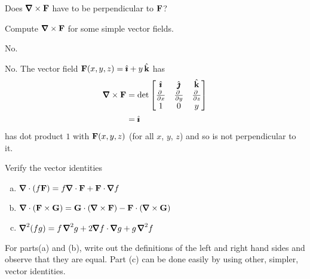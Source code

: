 \begin{question}
Does $\vnabla\times \vF$ have to be perpendicular to $\mathbf{F}$?
\end{question}

\begin{hint} 
Compute $\vnabla\times \vF$ for some simple vector fields.
\end{hint}

\begin{answer} 
No.
\end{answer}

\begin{solution} 
No.  The vector field $\mathbf{F}(x,y,z) = \hat{\pmb{\imath}} +y\,\hat{\mathbf{k}}$ has
\begin{align*}
\vnabla\times \vF
&=\det\left[\begin{matrix} \hi & \hj & \hk \\
                           \pdiff{}{x} & \pdiff{}{y} & \pdiff{}{z} \\
                           1 & 0 & y
            \end{matrix}\right] \\
&=\hi
\end{align*}
has dot product $1$ with $\mathbf{F}(x,y,z)$ (for all $x$, $y$, $z$) and
so is not perpendicular to it.
\end{solution}

\begin{question}
Verify the vector identities
\begin{enumerate}[(a)]
\item
$\vnabla\cdot(f\vF)=f\vnabla\cdot\vF+\vF\cdot\vnabla f$
\item
$\vnabla\cdot(\vF\times\vG)
                      =\vG\cdot(\vnabla\times\vF)-
                       \vF\cdot(\vnabla\times\vG)$
\item
$\vnabla^2(fg)=f\,\vnabla^2 g+2\vnabla f\cdot\vnabla g+g\,\vnabla^2 f$
\end{enumerate}

\end{question}

\begin{hint} 
For parts(a) and (b), write out the definitions of the left and right
hand sides and observe that they are equal.
Part (c) can be done easily by using other, simpler, vector identities.
\end{hint}

\begin{answer} 


\end{answer}

